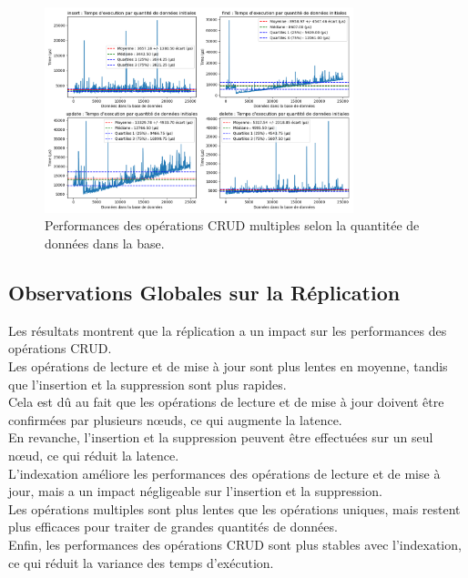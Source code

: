 \documentclass[12pt,a4paper]{report}
\begin{document}
                \begin{figure}[H]
                    \centering
                    \includegraphics[width=0.8\textwidth]{../plots/MongoDB/replica_set_indexed/test_many_various_data.png}
                    \caption{Performances des opérations CRUD multiples selon la quantitée de données dans la base.}
                    \label{fig:mongo_replica_many_various_indexed}
                \end{figure}

        \subsection{Observations Globales sur la Réplication}
            \begin{card}
                Les résultats montrent que la réplication a un impact sur les performances des opérations CRUD. \\
                Les opérations de lecture et de mise à jour sont plus lentes en moyenne, tandis que l'insertion et la suppression sont plus rapides. \\
                Cela est dû au fait que les opérations de lecture et de mise à jour doivent être confirmées par plusieurs nœuds, ce qui augmente la latence. \\
                En revanche, l'insertion et la suppression peuvent être effectuées sur un seul nœud, ce qui réduit la latence. \\
                L'indexation améliore les performances des opérations de lecture et de mise à jour, mais a un impact négligeable sur l'insertion et la suppression. \\
                Les opérations multiples sont plus lentes que les opérations uniques, mais restent plus efficaces pour traiter de grandes quantités de données. \\
                Enfin, les performances des opérations CRUD sont plus stables avec l'indexation, ce qui réduit la variance des temps d'exécution. \\
            \end{card}
\end{document}
